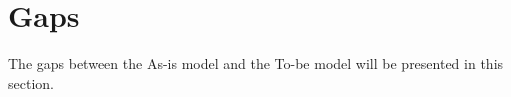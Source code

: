 \section{Gaps}
\label{sec:gaps}
The gaps between the As-is model and the To-be model will be presented in this section.